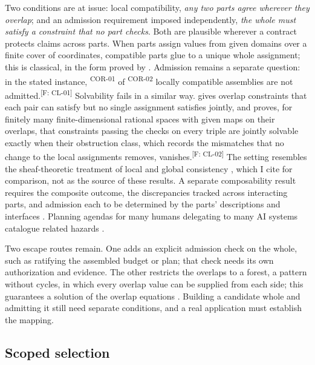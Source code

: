 \documentclass[pdflatex,sn-basic]{sn-jnl}%
\newcommand{\claim}[2]{\ifannotated\textsuperscript{\textcolor{blue!60!black}{\tiny[#1: #2]}}\fi}
\newcommand{\rec}[1]{\ifannotated\textsuperscript{\textcolor{blue!60!black}{\tiny#1}}\fi}
\begin{document}
Two conditions are at issue: local compatibility, \emph{any two parts agree wherever they overlap}; and an admission requirement imposed independently, \emph{the whole must satisfy a constraint that no part checks}. Both are plausible wherever a contract protects claims across parts. When parts assign values from given domains over a finite cover of coordinates, compatible parts glue to a unique whole assignment; this is classical, in the form proved by \citet{tsiokos2026v10}. Admission remains a separate question: in the stated instance, \numVTenNotAdmitted\rec{COR-01} of \numVTenCompatible\rec{COR-02} locally compatible assemblies are not admitted.\claim{F}{CL-01} Solvability fails in a similar way. \citet{tsiokos2026v12} gives overlap constraints that each pair can satisfy but no single assignment satisfies jointly, and proves, for finitely many finite-dimensional rational spaces with given maps on their overlaps, that constraints passing the checks on every triple are jointly solvable exactly when their obstruction class, which records the mismatches that no change to the local assignments removes, vanishes.\claim{F}{CL-02} The setting resembles the sheaf-theoretic treatment of local and global consistency \citep{abramsky2011}, which I cite for comparison, not as the source of these results. A separate composability result requires the composite outcome, the discrepancies tracked across interacting parts, and admission each to be determined by the parts' descriptions and interfaces \citep{tsiokos2026f4}. Planning agendas for many humans delegating to many AI systems catalogue related hazards \citep{critch2020arches}.

Two escape routes remain. One adds an explicit admission check on the whole, such as ratifying the assembled budget or plan; that check needs its own authorization and evidence. The other restricts the overlaps to a forest, a pattern without cycles, in which every overlap value can be supplied from each side; this guarantees a solution of the overlap equations \citep{tsiokos2026v12}. Building a candidate whole and admitting it still need separate conditions, and a real application must establish the mapping.

\subsection{Scoped selection}\label{sec:selection}
\end{document}
